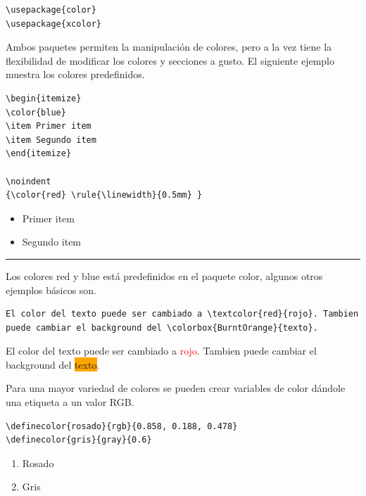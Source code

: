 \documentclass[letterpaper, 10pt, journal]{IEEEtran}
\begin{document}
\begin{lstlisting}
\usepackage{color}
\usepackage{xcolor}
\end{lstlisting}

Ambos paquetes permiten la manipulaci\'{o}n de colores, pero a la vez tiene la flexibilidad de modificar los colores y secciones a gusto. El siguiente ejemplo muestra los colores predefinidos.

\begin{lstlisting}
\begin{itemize}
\color{blue}
\item Primer item
\item Segundo item
\end{itemize}
 
\noindent
{\color{red} \rule{\linewidth}{0.5mm} }
\end{lstlisting}

\begin{itemize}
\color{blue}
\item Primer item
\item Segundo item
\end{itemize}
 
\noindent
{\color{red} \rule{\linewidth}{0.5mm} }

Los colores red y blue est\'{a} predefinidos en el paquete color, algunos otros ejemplos b\'{a}sicos son.

\begin{lstlisting}
El color del texto puede ser cambiado a \textcolor{red}{rojo}. Tambien puede cambiar el background del \colorbox{BurntOrange}{texto}.
\end{lstlisting}

El color del texto puede ser cambiado a \textcolor{red}{rojo}. Tambien puede cambiar el background del \colorbox{orange}{texto}.\par{}

Para una mayor variedad de colores se pueden crear variables de color d\'{a}ndole una etiqueta a un valor RGB.

\begin{lstlisting}
\definecolor{rosado}{rgb}{0.858, 0.188, 0.478}
\definecolor{gris}{gray}{0.6}
\end{lstlisting}


\begin{enumerate}
\item \textcolor{rosado}{Rosado}
\item \textcolor{gris}{Gris}
\end{enumerate}
\end{document}
